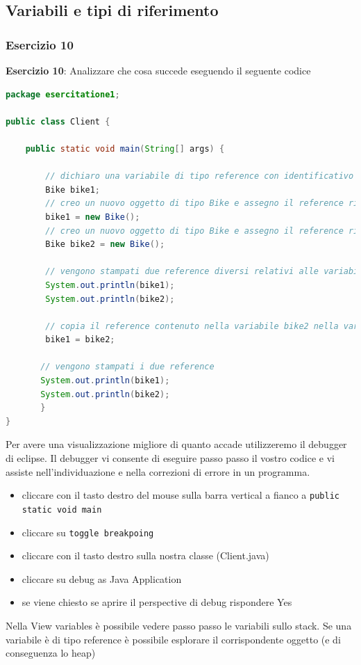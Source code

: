 \documentclass{article}
\theoremstyle{definition}
\begin{document}
\subsection{Variabili e tipi di riferimento}

\subsubsection{Esercizio 10}
\begin{framed}
\textbf{Esercizio 10}: Analizzare che cosa succede eseguendo il seguente codice
\end{framed}
\begin{lstlisting}[language=Java,escapechar=|]
package esercitatione1;

public class Client {

	public static void main(String[] args) {

        // dichiaro una variabile di tipo reference con identificativo bike1
        Bike bike1;
        // creo un nuovo oggetto di tipo Bike e assegno il reference ritornato alla variabile bike1
        bike1 = new Bike();
        // creo un nuovo oggetto di tipo Bike e assegno il reference ritornato alla variabile bike2
        Bike bike2 = new Bike();
        
        // vengono stampati due reference diversi relativi alle variabili bike1 e bike2
    	System.out.println(bike1);
    	System.out.println(bike2);
    	
    	// copia il reference contenuto nella variabile bike2 nella variabile bike1
    	bike1 = bike2;
    
       // vengono stampati i due reference
       System.out.println(bike1);
       System.out.println(bike2);	
       }
}
\end{lstlisting}
Per avere una visualizzazione migliore di quanto accade utilizzeremo il debugger di eclipse. Il debugger vi consente di eseguire passo passo il vostro codice e vi assiste nell'individuazione e nella correzioni di errore in un programma.

\begin{itemize}
\item cliccare con il tasto destro del mouse sulla barra vertical a fianco a \texttt{public static void main}
\item cliccare su \texttt{toggle breakpoing}
\item cliccare con il tasto destro sulla nostra classe (Client.java)
\item cliccare su debug as Java Application
\item se viene chiesto se aprire il perspective di debug rispondere Yes
\end{itemize}
Nella View variables \`e possibile vedere passo passo le variabili sullo stack. Se una variabile \`e di tipo reference \`e possibile esplorare il corrispondente oggetto (e di conseguenza lo heap)
\end{document}
